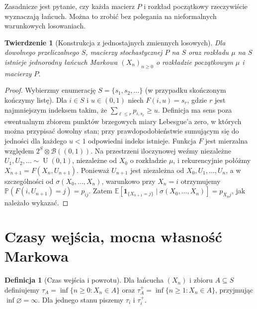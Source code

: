 \documentclass[11pt,a4paper,oneside]{report}
\numberwithin{equation}{chapter}
\theoremstyle{plain}
\newtheorem{twierdzenie}{Twierdzenie}[chapter]
\theoremstyle{definition}
\newtheorem{definicja}{Definicja}[chapter]
\theoremstyle{remark}
\newcommand{\Prob}{\mathbb{P}}
\newcommand{\E}{\mathbb{E}}
\newcommand{\ind}[1]{\mathbf{1}_{#1}}
\newcommand{\Unif}{\operatorname{U}}
\begin{document}
Zasadnicze jest pytanie, czy każda macierz $P$ i rozkład
początkowy rzeczywiście wyznaczają łańcuch. Można to
zrobić bez polegania na nieformalnych warunkowych
losowaniach.

\begin{twierdzenie}[Konstrukcja z jednostajnych zmiennych losowych]
Dla dowolnego przeliczalnego $S$, macierzy stochastycznej
$P$ na $S$ oraz rozkładu $\mu$ na $S$ istnieje
jednorodny łańcuch Markowa $(X_n)_{n\geq0}$
o rozkładzie początkowym $\mu$ i macierzy $P$.
\end{twierdzenie}
\begin{proof}
Wybierzmy enumerację $S=\{s_1,s_2,\ldots\}$
(w przypadku skończonym kończymy listę).
Dla $i\in S$ i $u\in(0,1)$ niech $F(i,u)=s_r$,
gdzie $r$ jest najmniejszym indeksem takim, że
$\sum_{\ell\leq r}p_{i,s_\ell}\geq u$.
Definicja ma sens poza ewentualnym zbiorem punktów
brzegowych miary Lebesgue'a zero, w których można
przypisać dowolny stan; przy prawdopodobieństwie
sumującym się do jedności dla każdego $u<1$
odpowiedni indeks istnieje. Funkcja $F$ jest
mierzalna względem $2^S\otimes\mathcal B((0,1))$.
Na przestrzeni iloczynowej weźmy niezależne
$U_1,U_2,\ldots\sim\Unif(0,1)$, niezależne od
$X_0$ o rozkładzie $\mu$, i rekurencyjnie połóżmy
$X_{n+1}=F(X_n,U_{n+1})$. Ponieważ
$U_{n+1}$ jest niezależna od $X_0,U_1,\ldots,U_n$,
a w szczególności od $\sigma(X_0,\ldots,X_n)$,
warunkowo przy $X_n=i$ otrzymujemy
$\Prob(F(i,U_{n+1})=j)=p_{ij}$.
Zatem $\E[\ind{\{X_{n+1}=j\}}\mid\sigma(X_0,\ldots,X_n)]
=p_{X_nj}$, jak należało wykazać.
\end{proof}

\section{Czasy wejścia, mocna własność Markowa}

\begin{definicja}[Czas wejścia i powrotu]
Dla łańcucha $(X_n)$ i zbioru $A\subseteq S$ definiujemy
$\tau_A=\inf\{n\geq0:X_n\in A\}$ oraz
$\tau_A^+=\inf\{n\geq1:X_n\in A\}$,
przyjmując $\inf\varnothing=\infty$.
Dla jednego stanu piszemy $\tau_i$ i $\tau_i^+$.
\end{definicja}
\end{document}

